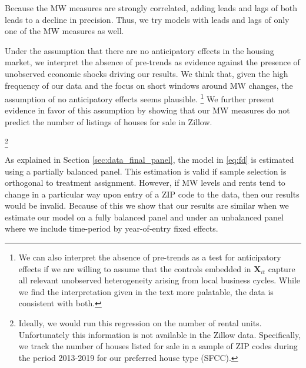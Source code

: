 
Because the MW measures are strongly correlated, adding leads and lags of both 
leads to a decline in precision.
Thus, we try models with leads and lags of only one of the MW measures as well.

Under the assumption that there are no anticipatory effects in the housing 
market, we interpret the absence of pre-trends as evidence against the presence 
of unobserved economic shocks driving our results.
We think that, given the high frequency of our data and the focus on short 
windows around MW changes, the assumption of no anticipatory effects seems 
plausible.%
\footnote{We can also interpret the absence of pre-trends as a test for 
anticipatory effects if we are willing to assume that the controls embedded in 
$\mathbf{X}_{it}$ capture all relevant unobserved heterogeneity arising from 
local business cycles.
While we find the interpretation given in the text more palatable, the data is 
consistent with both.}
We further present evidence in favor of this assumption by showing that our MW 
measures do not predict the number of listings of houses for sale in Zillow.%

\footnote{Ideally, we would run this regression on the number of rental units.
Unfortunately this information is not available in the Zillow data.
Specifically, we track the number of houses listed for sale in a sample of ZIP 
codes during the period 2013-2019 for our preferred house type (SFCC).}

As explained in Section \ref{sec:data_final_panel}, 
the model in \eqref{eq:fd} is estimated using a partially balanced panel.
This estimation is valid if sample selection is orthogonal to treatment 
assignment.
However, if MW levels and rents tend to change in a particular way upon entry 
of a ZIP code to the data, then our results would be invalid.
Because of this we show that our results are similar when we estimate our model
on a fully balanced panel and under an unbalanced panel where we include 
time-period by year-of-entry fixed effects.

